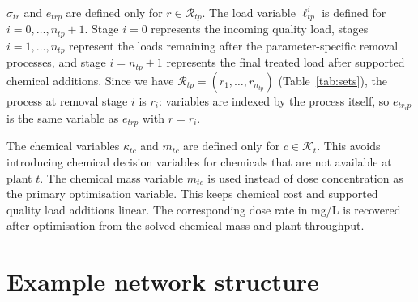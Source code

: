 \documentclass[10pt]{article}
\begin{document}
$\sigma_{tr}$ and $e_{trp}$ are defined only for $r \in \mathcal{R}_{tp}$.
The load variable $\ell^i_{tp}$ is defined for $i=0,\dots,n_{tp}+1$.
Stage $i=0$ represents the incoming quality load, stages $i=1,\dots,n_{tp}$ represent the loads remaining after the parameter-specific removal processes, and stage $i=n_{tp}+1$ represents the final treated load after supported chemical additions.
Since we have $\mathcal{R}_{tp} = (r_1, \dots, r_{n_{tp}})$ (Table~\ref{tab:sets}), the process at removal stage $i$ is $r_i$:
variables are indexed by the process itself, so $e_{t r_i p}$ is the same variable as $e_{trp}$ with $r = r_i$.

The chemical variables $\kappa_{tc}$ and $m_{tc}$ are defined only for $c \in \mathcal{K}_t$.
This avoids introducing chemical decision variables for chemicals that are not available at plant $t$.
The chemical mass variable $m_{tc}$ is used instead of dose concentration as the primary optimisation variable.
This keeps chemical cost and supported quality load additions linear.
The corresponding dose rate in mg/L is recovered after optimisation from the solved chemical mass and plant throughput.

\section{Example network structure}
\begin{center}
\end{center}
\end{document}
